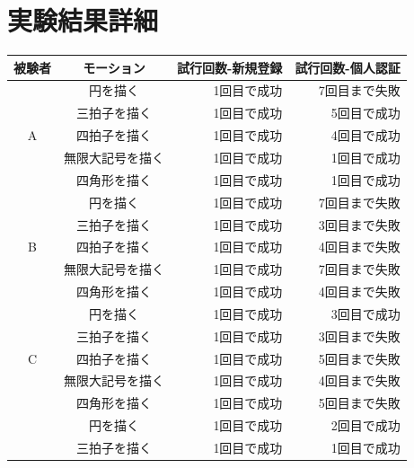 \documentclass[11pt]{jreport}
\begin{document}
\chapter{実験結果詳細}
        \begin{center}
            \begin{longtable}{|c|c|r|r|}
            \hline
                被験者 & モーション & 試行回数-新規登録 & 試行回数-個人認証 \\ \hline \hline \endhead
                  & 円を描く & 1回目で成功 & 7回目まで失敗 \\ \cline{2-4} %
                  & 三拍子を描く & 1回目で成功 & 5回目で成功 \\ \cline{2-4}
                A & 四拍子を描く & 1回目で成功 & 4回目で成功 \\ \cline{2-4}
                  & 無限大記号を描く & 1回目で成功 & 1回目で成功 \\ \cline{2-4}
                  & 四角形を描く & 1回目で成功 & 1回目で成功 \\ \hline %
                  & 円を描く & 1回目で成功 & 7回目まで失敗 \\ \cline{2-4} %
                  & 三拍子を描く & 1回目で成功 & 3回目まで失敗 \\ \cline{2-4}
                B & 四拍子を描く & 1回目で成功 & 4回目まで失敗 \\ \cline{2-4}
                  & 無限大記号を描く & 1回目で成功 & 7回目まで失敗 \\ \cline{2-4}
                  & 四角形を描く & 1回目で成功 & 4回目まで失敗 \\ \hline %
                  & 円を描く & 1回目で成功 & 3回目で成功 \\ \cline{2-4} %
                  & 三拍子を描く & 1回目で成功 & 3回目まで失敗 \\ \cline{2-4}
                C & 四拍子を描く & 1回目で成功 & 5回目まで失敗 \\ \cline{2-4}
                  & 無限大記号を描く & 1回目で成功 & 4回目まで失敗 \\ \cline{2-4}
                  & 四角形を描く & 1回目で成功 & 5回目まで失敗 \\ \hline %
                  & 円を描く & 1回目で成功 & 2回目で成功 \\ \cline{2-4} %
                  & 三拍子を描く & 1回目で成功 & 1回目で成功 \\ \cline{2-4}

\end{longtable}
\end{center}
\end{document}
